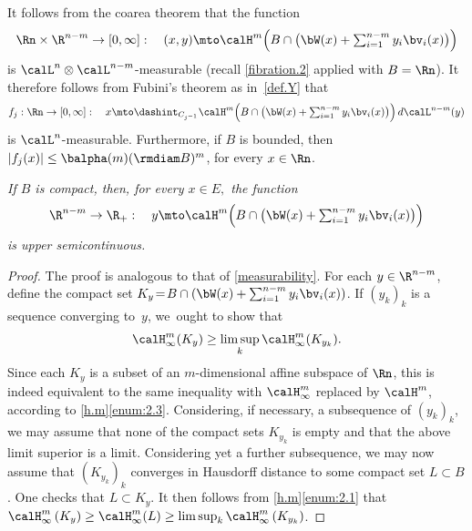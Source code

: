 \begin{Empty}
\label{rem.1}
It follows from the coarea theorem that the function
\begin{equation*}
\Rn \times \R^{n-m} \to [0,\infty]:\quad (x,y) \mto \textstyle\calH^m \Bigl(B \cap \bigl(\bW(x) + \sum_{i=1}^{n-m} y_i \bv_i(x) \bigr) \Bigr)
\end{equation*}
is $\calL^n \otimes \calL^{n-m}$-measurable (recall \ref{fibration.2} applied with $B = \Rn$).
It therefore follows from Fubini's theorem as in~\ref{def.Y} that
\begin{equation*}
f_j: \Rn \to [0,\infty]:\quad x \mto \dashint_{C_{j^{-1}}} \textstyle\calH^m \Bigl(B \cap \bigl(\bW(x) + \sum_{i=1}^{n-m} y_i \bv_i(x) \bigr) \Bigr) \,d\calL^{n-m}(y)
\end{equation*}
is $\calL^n$-measurable.
Furthermore, if $B$ is bounded, then $|f_j(x)| \leq \balpha(m) (\rmdiam B)^m$, for every $x \in \Rn$.
\end{Empty}

\begin{Empty}[]
\label{usc}
{\it
If $B$ is compact, then, for every $x \in E,$ the function
\begin{equation*}
\R^{n-m} \to \R_+:\quad y \mto \textstyle\calH^m \Bigl(B \cap \bigl(\bW(x) + \sum_{i=1}^{n-m} y_i \bv_i(x) \bigr) \Bigr)
\end{equation*}
is upper semicontinuous.
}
\end{Empty}

\begin{proof}
The proof is analogous to that of \ref{measurability}.
For each $y \in \R^{n-m}$, define the compact set $K_y \!=\! B \cap(\bW(x) + \sum_{i=1}^{n-m} y_i \bv_i(x))$.
If $(y_k)_k$ is a sequence converging to~$y$, we~ought to show that
\begin{equation*}
\calH^m_\infty(K_y) \geq \limsup_k \calH^m_\infty(K_{y_k}).
\end{equation*}
Since each $K_y$ is a subset of an $m$-dimensional affine subspace of $\Rn$, this is indeed equivalent to the same inequality with $\calH^m_\infty$ replaced by $\calH^m$, according to \ref{h.m}\eqref{enum:2.3}.
Considering, if necessary, a subsequence of $(y_k)_k$, we may assume that none of the compact sets $K_{y_k}$ is empty and that the above limit superior is a limit.
Considering yet a further subsequence, we may now assume that $(K_{y_k})_k$ converges in Hausdorff distance to some compact set $L \subset B$.
One checks that $L \subset K_y$.
It then follows from \ref{h.m}\eqref{enum:2.1} that $\calH^m_\infty \left(K_y\right) \geq \calH^m_\infty (L) \geq \limsup_k \calH^m_\infty \left(K_{y_k} \right)$.
\end{proof}

